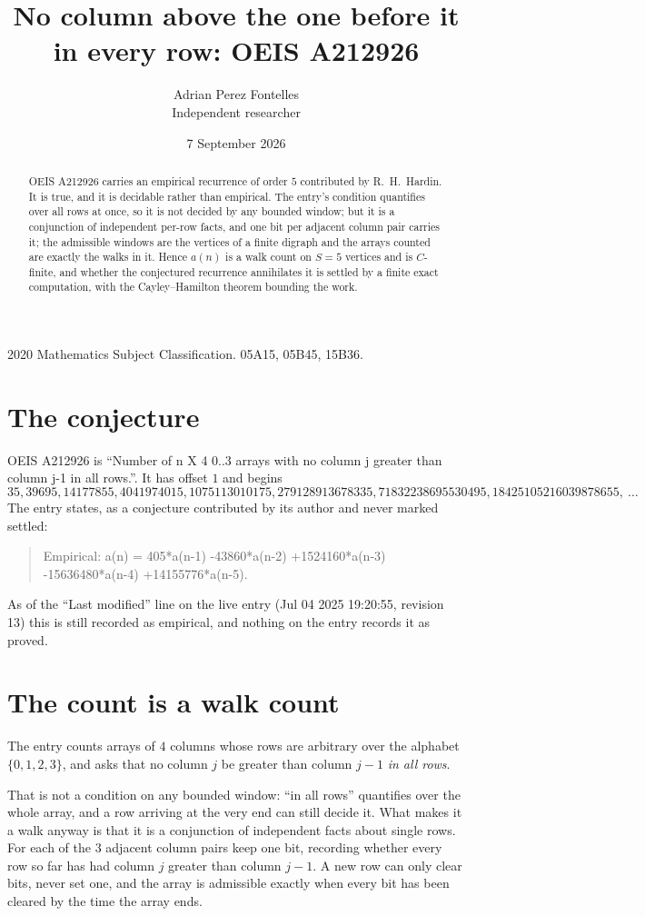 \documentclass[11pt,a4paper]{article}
\title{No column above the one before it in every row: OEIS A212926}
\author{Adrian Perez Fontelles\\ \small Independent researcher}
\date{7 September 2026}
\theoremstyle{plain}
\theoremstyle{definition}
\begin{document}
\maketitle

\begin{abstract}
OEIS A212926 carries an empirical recurrence of order $5$ contributed by R.~H.~Hardin. It is
true, and it is decidable rather than empirical. The entry's condition quantifies over all rows at once, so it is not decided by any
bounded window; but it is a conjunction of independent per-row facts, and one bit per
adjacent column pair carries it; the
admissible windows are the vertices of a finite digraph and the arrays counted are exactly the
walks in it. Hence $a(n)$ is a walk count on $S=5$ vertices and is $C$-finite, and whether the
conjectured recurrence annihilates it is settled by a finite exact computation, with the
Cayley--Hamilton theorem bounding the work.
\end{abstract}

\noindent\small 2020 Mathematics Subject Classification. 05A15, 05B45, 15B36.\normalsize

\section{The conjecture}

OEIS A212926 is ``Number of n X 4 0..3 arrays with no column j greater than column j-1 in all rows.''. It has offset $1$ and begins
\[
35, 39695, 14177855, 4041974015, 1075113010175, 279128913678335, 71832238695530495, 18425105216039878655,\ \dots
\]
The entry states, as a conjecture contributed by its author and never marked settled:
\begin{quote}
Empirical: a(n) = 405*a(n-1) -43860*a(n-2) +1524160*a(n-3) -15636480*a(n-4) +14155776*a(n-5).
\end{quote}
As of the ``Last modified'' line on the live entry (Jul 04 2025 19:20:55, revision 13) this is still
recorded as empirical, and nothing on the entry records it as proved.

\section{The count is a walk count}

The entry counts arrays of $4$ columns whose rows are arbitrary over the alphabet $\{0,1,2,3\}$, and asks that no column $j$ be greater than column $j-1$ \emph{in all rows}.

That is not a condition on any bounded window: ``in all rows'' quantifies over the whole array, and a row arriving at the very end can still decide it. What makes it a walk anyway is that it is a conjunction of independent facts about single rows. For each of the $3$ adjacent column pairs keep one bit, recording whether every row so far has had column $j$ greater than column $j-1$. A new row can only clear bits, never set one, and the array is admissible exactly when every bit has been cleared by the time the array ends.
\end{document}
